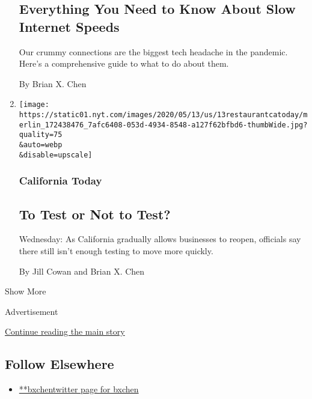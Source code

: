 \begin{enumerate}
  \hypertarget{everything-you-need-to-know-about-slow-internet-speeds}{%
  \subsection{Everything You Need to Know About Slow Internet
  Speeds}\label{everything-you-need-to-know-about-slow-internet-speeds}}

  Our crummy connections are the biggest tech headache in the pandemic.
  Here's a comprehensive guide to what to do about them.

  By Brian X. Chen
\item
  \href{/2020/05/13/us/california-covid-testing-reopening.html}{}

  \texttt{[image: https://static01.nyt.com/images/2020/05/13/us/13restaurantcatoday/merlin\_172438476\_7afc6408-053d-4934-8548-a127f62bfbd6-thumbWide.jpg?quality=75\\\&auto=webp\\\&disable=upscale]}

  \hypertarget{california-today}{%
  \subsubsection{California Today}\label{california-today}}

  \hypertarget{to-test-or-not-to-test}{%
  \subsection{To Test or Not to Test?}\label{to-test-or-not-to-test}}

  Wednesday: As California gradually allows businesses to reopen,
  officials say there still isn't enough testing to move more quickly.

  By Jill Cowan and Brian X. Chen
\end{enumerate}

Show More

Advertisement

\protect\hyperlink{after-mid2}{Continue reading the main story}

\hypertarget{follow-elsewhere}{%
\subsection{Follow Elsewhere}\label{follow-elsewhere}}

\begin{itemize}
\tightlist
\item
  \href{https://twitter.com/bxchen}{**bxchentwitter page for bxchen}
\end{itemize}


